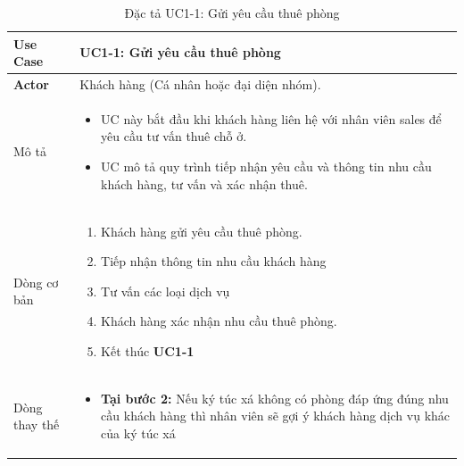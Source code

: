 \vspace{0.5cm}
\begin{table}[H]
    \centering
\begin{tabularx}{\textwidth}{|>{\centering\arraybackslash\bfseries}m{3.5cm}|X|}
    \hline
    Use Case & {\centering\textbf{UC1-1: Gửi yêu cầu thuê phòng}\par} \\ 
    \hline
     
    Actor & Khách hàng (Cá nhân hoặc đại diện nhóm). \\
    \hline

    Mô tả & 
    \begin{itemize}[leftmargin=*, nosep, label=-]
        \vspace{0.2cm}
        \item UC này bắt đầu khi khách hàng liên hệ với nhân viên sales để yêu cầu tư vấn thuê chỗ ở.
        \item UC mô tả quy trình tiếp nhận yêu cầu và thông tin nhu cầu khách hàng, tư vấn và xác nhận thuê.
    \end{itemize} \\ 
    \hline
     
    Dòng cơ bản & 
    \begin{enumerate}[leftmargin=*, nosep]
        \vspace{0.2cm}
        \item Khách hàng gửi yêu cầu thuê phòng.
        \item Tiếp nhận thông tin nhu cầu khách hàng
        \item Tư vấn các loại dịch vụ
        \item Khách hàng xác nhận nhu cầu thuê phòng.
        \item Kết thúc \textbf{UC1-1}
    \end{enumerate} \\ 
    \hline
     
    Dòng thay thế & 
    \vspace{0.2cm}
    \begin{itemize}[leftmargin=*, nosep, label=-]
        \vspace{0.2cm}
        \item \textbf{Tại bước 2:} Nếu ký túc xá không có phòng đáp ứng đúng nhu cầu khách hàng thì nhân viên sẽ gợi ý khách hàng dịch vụ khác của ký túc xá
    \end{itemize} \\ 
    \hline
\end{tabularx}
\caption{Đặc tả UC1-1: Gửi yêu cầu thuê phòng}
\end{table}

